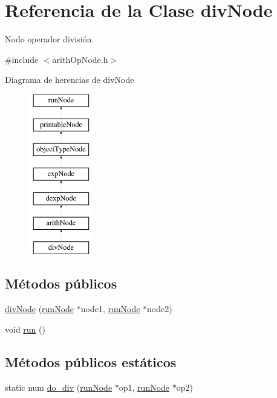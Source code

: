 \hypertarget{classdivNode}{\section{Referencia de la Clase div\-Node}
\label{classdivNode}
}


Nodo operador división.  




{\ttfamily \#include $<$arith\-Op\-Node.\-h$>$}

Diagrama de herencias de div\-Node\begin{figure}[H]
\begin{center}
\leavevmode
\includegraphics[height=7.000000cm]{classdivNode}
\end{center}
\end{figure}
\subsection*{Métodos públicos}
\begin{DoxyCompactItemize}
\item 
\hyperlink{classdivNode_aaf5444aa1b13960627066006f1a1ed5c}{div\-Node} (\hyperlink{classrunNode}{run\-Node} $\ast$node1, \hyperlink{classrunNode}{run\-Node} $\ast$node2)
\item 
void \hyperlink{classdivNode_a56aa027a86b596362a5741bed8b8eb51}{run} ()
\end{DoxyCompactItemize}
\subsection*{Métodos públicos estáticos}
\begin{DoxyCompactItemize}
\item 
static num \hyperlink{classdivNode_a6ecab675baf7410067278bf0a1734f0e}{do\-\_\-div} (\hyperlink{classrunNode}{run\-Node} $\ast$op1, \hyperlink{classrunNode}{run\-Node} $\ast$op2)
\end{DoxyCompactItemize}
